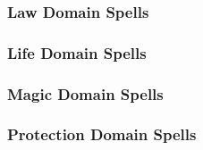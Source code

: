 \begin{spelllist}
    \SLboonofperception[1]
    \SLboonofknowledge[2]
    \SLboonofmastery[3]
    \SLboonofmanyeyes[4]
    \SLboonofprecision[5]
    \SLtrueseeing[6]
    \SLscrybolt[7]
    \SLthirdeye[8]
    \SLrevelation[9]
\end{spelllist}

\subsubsection{Law Domain Spells}

\begin{spelllist}
    \SLprotectionfromalignment[1]
    \SLdiscernlies[2]
    \SLorderswrath[3]
    \SLmarkofscrying[4]
    \SLdictum[5]
    \SLprohibition[6]
    \SLavataroffealty[7]
    \SLimprisonment[8]
    \SLavataroforder[9]
\end{spelllist}

\subsubsection{Life Domain Spells}

\begin{spelllist}
    \SLcurewounds[1]
    \SLsharepain[2]
    \SLrestoration[3]
    \SLavatarofhealing[4]
    \SLrevivify[5]
    \SLheal[6]
    \SLdivineshield[7]
    \SLlifebound[8]
    \SLavataroflife[9]
\end{spelllist}

\subsubsection{Magic Domain Spells}

\begin{spelllist}
    \SLmagicmissile[1]
    \SLdimensionalanchor[2]
    \SLdispelmagic[3]
    \SLmissilestorm[4]
    \SLavatarofmissiles[5]
    \SLspellsight[6]
    \SLantimagicfield[7]
    \SLsevermagic[8]
    \SLdisjoinmagic[9]
\end{spelllist}

\subsubsection{Protection Domain Spells}

\begin{spelllist}
    \SLsanctuary[1]
    \SLsharepain[2]
    \SLresistmagic[3]
    \SLdeathward[4]
    \SLprismaticwall[5]
    \SLauraofimmunity[6]
    \SLavatarofshielding[7]
    \SLmartyrsgift[8]
    \SLshadowshield[9]
\end{spelllist}

